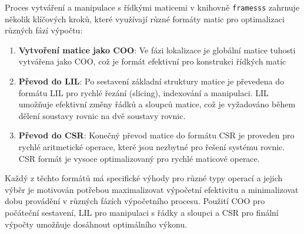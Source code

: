 Proces vytváření a manipulace s řídkými maticemi v knihovně \texttt{framesss} zahrnuje několik klíčových kroků, které využívají různé formáty matic pro optimalizaci různých fází výpočtu:

\begin{enumerate}
    \item \textbf{Vytvoření matice jako COO}: Ve fázi lokalizace je globální matice tuhosti vytvářena jako COO, což je formát efektivní pro konstrukci řídkých matic
    
    \item \textbf{Převod do LIL}: Po sestavení základní struktury matice je převedena do formátu LIL pro rychlé řezání (slicing), indexování a manipulaci. LIL umožňuje efektivní změny řádků a sloupců matice, což je vyžadováno během dělení soustavy rovnic na dvě soustavy rovnic.
    
    \item \textbf{Převod do CSR}: Konečný převod matice do formátu CSR je proveden pro rychlé aritmetické operace, které jsou nezbytné pro  řešení systému rovnic. CSR formát je vysoce optimalizovaný pro rychlé maticové operace.
\end{enumerate}

Každý z těchto formátů má specifické výhody pro různé typy operací a jejich výběr je motivován potřebou maximalizovat výpočetní efektivitu a minimalizovat dobu provádění v různých fázích výpočetního procesu. Použití COO pro počáteční sestavení, LIL pro manipulaci s řádky a sloupci a CSR pro finální výpočty umožňuje dosáhnout optimálního výkonu.
